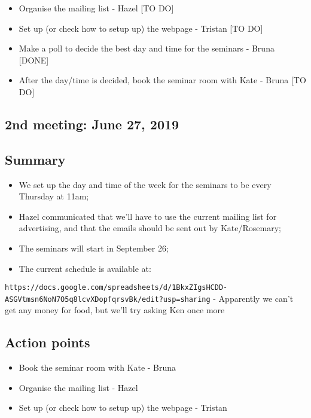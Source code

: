 \documentclass[]{article}
\providecommand{\tightlist}{%
  \setlength{\itemsep}{0pt}\setlength{\parskip}{0pt}}
\begin{document}
\begin{itemize}
\tightlist
\item
  Organise the mailing list - Hazel {[}TO DO{]}
\item
  Set up (or check how to setup up) the webpage - Tristan {[}TO DO{]}
\item
  Make a poll to decide the best day and time for the seminars - Bruna
  {[}DONE{]}
\item
  After the day/time is decided, book the seminar room with Kate - Bruna
  {[}TO DO{]}
\end{itemize}

\hypertarget{nd-meeting-june-27-2019}{%
\subsection{2nd meeting: June 27, 2019}\label{nd-meeting-june-27-2019}}

\hypertarget{summary-1}{%
\subsection{Summary}\label{summary-1}}

\begin{itemize}
\tightlist
\item
  We set up the day and time of the week for the seminars to be every
  Thursday at 11am;
\item
  Hazel communicated that we'll have to use the current mailing list for
  advertising, and that the emails should be sent out by Kate/Rosemary;
\item
  The seminars will start in September 26;
\item
  The current schedule is available at:
\end{itemize}

\texttt{https://docs.google.com/spreadsheets/d/1BkxZIgsHCDD-ASGVtmsn6NoN7O5q8lcvXDopfqrsvBk/edit?usp=sharing}
- Apparently we can't get any money for food, but we'll try asking Ken
once more

\hypertarget{action-points-1}{%
\subsection{Action points}\label{action-points-1}}

\begin{itemize}
\tightlist
\item
  Book the seminar room with Kate - Bruna
\item
  Organise the mailing list - Hazel
\item
  Set up (or check how to setup up) the webpage - Tristan
\end{itemize}
\end{document}
